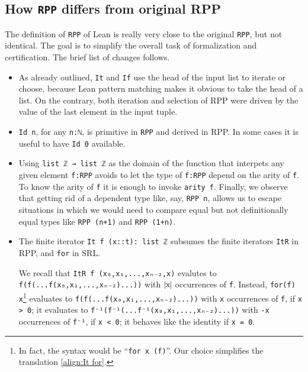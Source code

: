 \documentclass[runningheads]{llncs}
\newcommand{\RPP}{\textsf{RPP}\xspace}
\newcommand{\LEAN}{\textsf{Lean}\xspace}
\newcommand{\SRL}{\textsf{SRL}\xspace}
\begin{document}
\subsection{How {\normalfont \lstinline|RPP|} differs from original {\normalfont \RPP}}
The definition of \lstinline|RPP| of \LEAN is really very close to the original \lstinline|RPP|, but not identical. The goal is to simplify the overall task of formalization and certification. The brief list of changes follows.
\begin{itemize}
    \item As already outlined, \lstinline|It| and \lstinline|If| use the head of the input list to iterate or choose, because \LEAN pattern matching makes it obvious to take the head of a list. On the contrary, both iteration and selection of \RPP were driven by the value of the last element in the input tuple.

    \item \lstinline|Id n|, for any \lstinline|n:ℕ|, is primitive in \lstinline|RPP| and derived in \RPP. In some cases it is useful to have \lstinline|Id 0| available.

    \item Using \lstinline|list ℤ → list ℤ| as the domain of the function that interpets any given element \lstinline|f:RPP| avoids to let the type of \lstinline|f:RPP| depend on the arity of \lstinline|f|. To know the arity of \lstinline|f| it is enough to invoke \lstinline|arity f|. Finally, we observe that getting rid of a dependent type like, say, \lstinline|RPP n|, allows us to escape situations in which we would need to compare equal but not definitionally equal types like \lstinline|RPP (n+1)| and \lstinline|RPP (1+n)|.

    \item The finite iterator \lstinline|It f (x::t): list ℤ| subsumes the finite iterators \lstinline|ItR| in \RPP, and \lstinline|for| in \SRL.

    We recall that \lstinline|ItR f (x₀,x₁,...,xₙ₋₂,x)| evalutes to \lstinline|f(f(...f(x₀,x₁,...,xₙ₋₂)...))| with $ \mid\!\!\mbox{\lstinline|x|}\!\!\mid $ occurrences of \lstinline|f|.
    Instead, \lstinline|for(f) x|\footnote{In fact, the syntax would be ``\lstinline|for x (f)|''. Our choice simplifies the translation \eqref{align:It for}.} evaluates to \lstinline|f(f(...f(x₀,x₁,...,xₙ₋₂)...))| with \lstinline|x| occurrences of \lstinline|f|, if \lstinline|x > 0|; it evaluates to \lstinline|f⁻¹(f⁻¹(...f⁻¹(x₀,x₁,...,xₙ₋₂)...))| with \lstinline|-x| occurrences of \lstinline|f⁻¹|, if \lstinline|x < 0|; it behaves like the identity if \lstinline|x = 0|.


\end{itemize}
\end{document}
